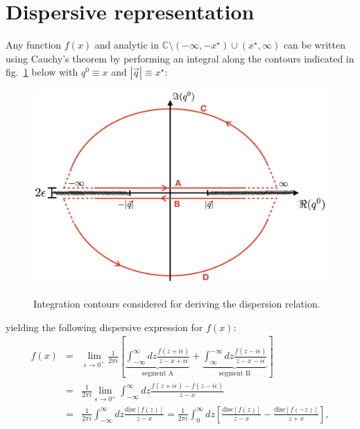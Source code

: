\documentclass[11pt]{article}
\begin{document}
\section{Dispersive representation}

Any function $f(x)$ and analytic in $\mathbb{C}\setminus(-\infty,-x^\star)\cup(x^\star,\infty)$ can be written using Cauchy's theorem by performing an integral along the contours indicated in fig.~\ref{IntegrationContours} below with $q^0\equiv x$ and $|\vec{q}|\equiv x^\star$:
\begin{figure}[ht!]
\begin{center}
\begin{minipage}{0.65\linewidth}
\centering
{\caption{\label{IntegrationContours} Integration contours considered for deriving the dispersion relation.}}
{\includegraphics[width=0.75\linewidth]{integration_contour.png}}
\end{minipage}\hfill
\end{center}
\end{figure}
yielding the following dispersive expression for $f(x)$:
\begin{eqnarray}
f(x)&=& \lim_{\epsilon \rightarrow 0^+}\frac{1}{2\pi i} \left[ 
\underbrace{ \int_{-\infty}^\infty d z \frac{ f(z+i\epsilon) }{z-x+i\epsilon} }_{\textrm{segment A}} +
\underbrace{ \int_{\infty}^{-\infty} d z \frac{ f(z-i\epsilon) }{z-x-i\epsilon} }_{\textrm{segment B}}
\right ] \nonumber \\
&=& 
\frac{1}{2\pi i}  \lim_{\epsilon \rightarrow 0^+} \int_{-\infty}^\infty d z \frac{f(z+i\epsilon) - f(z-i\epsilon)   }{z-x} \nonumber \\
&=&
\frac{1}{2\pi i} \int_{-\infty}^\infty d z \frac{ \textrm{disc} \left[ f(z) \right] }{z-x}
=\frac{1}{2\pi i} \int_{0}^\infty d z \left[ \frac{ \textrm{disc} \left[ f(z) \right] }{z-x}-\frac{ \textrm{disc} \left[ f(-z) \right] }{z+x}\right]
,\label{DispertionRelation}
\end{eqnarray}
\end{document}
